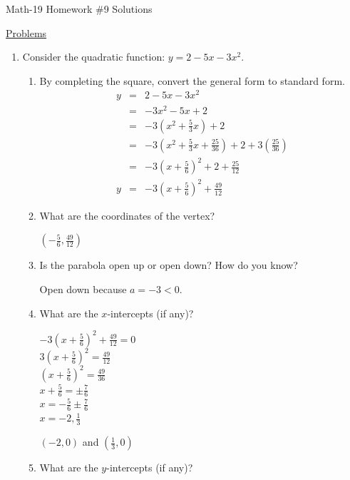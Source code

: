 \documentclass[letterpaper,12pt,fleqn]{article}
\begin{document}
\begin{center}
\Large Math-19 Homework \#9 Solutions
\end{center}

\vspace{0.5in}

\underline{Problems}

\begin{enumerate}
\item Consider the quadratic function: $y=2-5x-3x^2$.
  \begin{enumerate}
  \item By completing the square, convert the general form to standard form.
    \begin{eqnarray*}
      y &=& 2-5x-3x^2 \\
      &=& -3x^2-5x+2 \\
      &=& -3\left(x^2+\frac{5}{3}x\right)+2 \\
      &=& -3\left(x^2+\frac{5}{3}x+\frac{25}{36}\right)+2+
      3\left(\frac{25}{36}\right) \\
      &=& -3\left(x+\frac{5}{6}\right)^2+2+\frac{25}{12} \\
      y &=& -3\left(x+\frac{5}{6}\right)^2+\frac{49}{12}
    \end{eqnarray*}
    
  \item What are the coordinates of the vertex?

    $\left(-\frac{5}{6},\frac{49}{12}\right)$
    
  \item Is the parabola open up or open down? How do you know?

    Open down because $a=-3<0$.
    
  \item What are the $x$-intercepts (if any)?

    $-3\left(x+\frac{5}{6}\right)^2+\frac{49}{12}=0$ \\
    $3\left(x+\frac{5}{6}\right)^2=\frac{49}{12}$ \\
    $\left(x+\frac{5}{6}\right)^2=\frac{49}{36}$ \\
    $x+\frac{5}{6}=\pm\frac{7}{6}$ \\
    $x=-\frac{5}{6}\pm\frac{7}{6}$ \\
    $x=-2,\frac{1}{3}$

    $(-2,0)$ and $\left(\frac{1}{3},0\right)$
    
  \item What are the $y$-intercepts (if any)?


\end{enumerate}
\end{enumerate}
\end{document}
